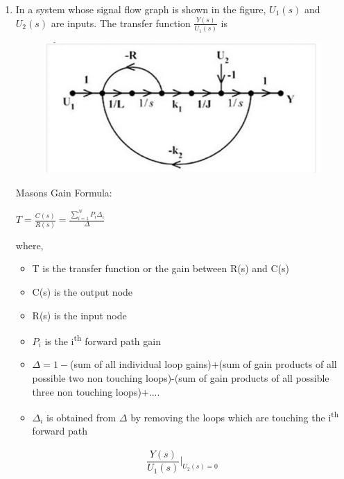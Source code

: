 \begin{enumerate}[label=\thesection.\arabic*.,ref=\thesection.\theenumi]
\item In a system whose signal flow graph is shown in the figure, $U_1(s)$ and $U_2(s)$ are inputs. The transfer function $\frac{Y(s)}{U_1(s)}$ is

\begin{figure}[!h]
  \includegraphics[width=\columnwidth]{image.jpg}
  
\end{figure}



\solution

Masons Gain Formula:

$T=\frac{C(s)}{R(s)}=\frac{\sum_{i=1}^{N}P_i \Delta_i }{\Delta}$

where,
\begin{itemize}
    \item T is the transfer function or the gain between R(s) and C(s)
    \item C(s) is the output node
    \item R(s) is the input node
    \item $P_i$ is the i\textsuperscript{th} forward path gain
    \item $\Delta= 1 - $(sum of all individual loop gains)+(sum of gain products of all possible two non touching loops)-(sum of gain products of all possible three non touching loops)+.... 
    \item $\Delta_i$ is obtained from $\Delta$ by removing the loops which are touching the i\textsuperscript{th} forward path  
     
    
    
\end{itemize}


\begin{align}
\dfrac{Y(s)}{U_1(s)}\Biggr|_{U_2(s)=0}
\end{align}


\end{enumerate}
